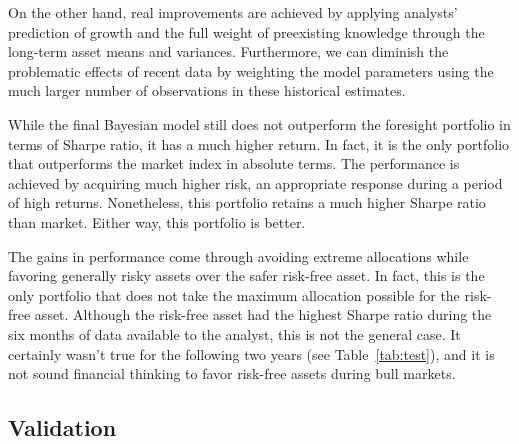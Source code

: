 \documentclass[a4paper]{article}\usepackage[]{graphicx}\usepackage[]{color}
\begin{document}
On the other hand, real improvements are achieved by applying analysts' prediction of growth and the full weight of preexisting knowledge through the long-term asset means and variances. Furthermore, we can diminish the problematic effects of recent data by weighting the model parameters using the much larger number of observations in these historical estimates.

While the final Bayesian model still does not outperform the foresight portfolio in terms of Sharpe ratio, it has a much higher return. In fact, it is the only portfolio that outperforms the market index in absolute terms. The performance is achieved by acquiring much higher risk, an appropriate response during a period of high returns. Nonetheless, this portfolio retains a much higher Sharpe ratio than market. Either way, this portfolio is better.

The gains in performance come through avoiding extreme allocations while favoring generally risky assets over the safer risk-free asset. In fact, this is the only portfolio that does not take the maximum allocation possible for the risk-free asset. Although the risk-free asset had the highest Sharpe ratio during the six months of data available to the analyst, this is not the general case. It certainly wasn't true for the following two years (see Table~\ref{tab:test}), and it is not sound financial thinking to favor risk-free assets during bull markets.

\begin{table}
    \centering
    \caption{Expected returns, standard deviations and Sharpe ratios for the candidate assets for the various portfolios over the test period. The data used for estimating these statistics cover 01-09-2012 to 12-30-2013.}
    \label{tab:test}
\end{table}

\subsection{Validation}
\end{document}
